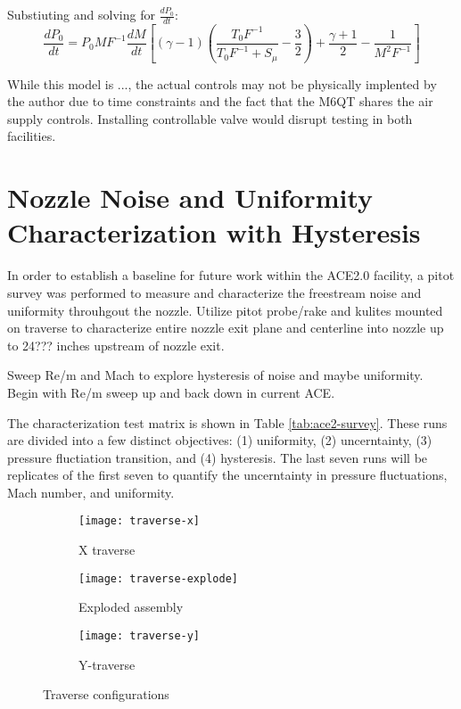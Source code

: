 Substiuting and solving for $\frac{dP_0}{dt}$:
\begin{equation}
    \frac{dP_0}{dt} = P_0 M F^{-1} \frac{dM}{dt} \left[ (\gamma-1) \left( \frac{T_0 F^{-1}}{T_0 F^{-1} + S_\mu} - \frac{3}{2} \right) + \frac{\gamma+1}{2} - \frac{1}{M^2 F^{-1}} \right]
\end{equation}

While this model is ..., the actual controls may not be physically implented by the author due to time constraints and the fact that the M6QT shares the air supply controls. Installing controllable valve would disrupt testing in both facilities.

\section{Nozzle Noise and Uniformity Characterization with Hysteresis}

In order to establish a baseline for future work within the ACE2.0 facility, a pitot survey was performed to measure and characterize the freestream noise and uniformity throuhgout the nozzle. Utilize pitot probe/rake and kulites mounted on traverse to characterize entire nozzle exit plane and centerline into nozzle up to 24??? inches upstream of nozzle exit.

Sweep Re/m and Mach to explore hysteresis of noise and maybe uniformity. Begin with Re/m sweep up and back down in current ACE.

The characterization test matrix is shown in Table \ref{tab:ace2-survey}. These runs are divided into a few distinct objectives: (1) uniformity, (2) uncerntainty, (3) pressure fluctiation transition, and (4) hysteresis. The last seven runs will be replicates of the first seven to quantify the uncerntainty in pressure fluctuations, Mach number, and uniformity.

\begin{figure}[ht]
    \centering
    \begin{subfigure}[b]{0.4\textwidth}
            \texttt{[image: traverse-x]}
        \caption{X traverse}
        \label{fig:traverse-x}
    \end{subfigure}
    \begin{subfigure}[b]{0.22\textwidth}
            \texttt{[image: traverse-explode]}
        \caption{Exploded assembly}
        \label{fig:traverse-explode}
    \end{subfigure}
    \begin{subfigure}[b]{0.35\textwidth}
            \texttt{[image: traverse-y]}
        \caption{Y-traverse}
        \label{fig:traverse-y}
    \end{subfigure}
    \caption{Traverse configurations}
    \label{fig:traverse}
\end{figure}

